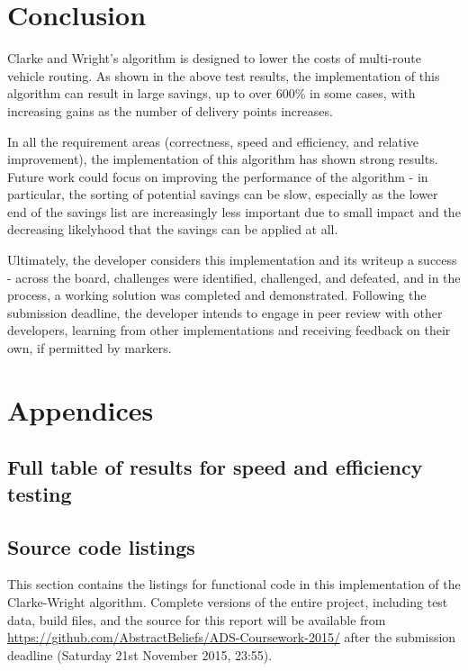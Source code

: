 \documentclass[a4paper]{article}
\begin{document}
    \section{Conclusion}
    Clarke and Wright's algorithm is designed to lower the costs of multi-route vehicle routing. As shown in the above test results, the implementation of this
    algorithm can result in large savings, up to over 600\% in some cases, with increasing gains as the number of delivery points increases.

    In all the requirement areas (correctness, speed and efficiency, and relative improvement), the implementation of this algorithm has shown strong results.
    Future work could focus on improving the performance of the algorithm - in particular, the sorting of potential savings can be slow, especially as the lower
    end of the savings list are increasingly less important due to small impact and the decreasing likelyhood that the savings can be applied at all.

    Ultimately, the developer considers this implementation and its writeup a success - across the board, challenges were identified, challenged, and defeated,
    and in the process, a working solution was completed and demonstrated. Following the submission deadline, the developer intends to engage in peer review
    with other developers, learning from other implementations and receiving feedback on their own, if permitted by markers.

    
    
    
    \section{Appendices}
        \subsection{Full table of results for speed and efficiency testing}
        \subsection{Source code listings}
            This section contains the listings for functional code in this implementation of the Clarke-Wright algorithm.
            Complete versions of the entire project, including test data, build files, and the source for this report will be available from
            \url{https://github.com/AbstractBeliefs/ADS-Coursework-2015/} after the submission deadline (Saturday 21st November 2015, 23:55).
\end{document}
